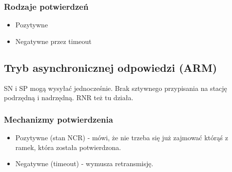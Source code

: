 			\subsubsection{Rodzaje potwierdzeń}
				\begin{itemize}
					\item Pozytywne
					\item Negatywne przez timeout
				\end{itemize}
		\subsection{Tryb asynchronicznej odpowiedzi (ARM)}
			SN i SP mogą wysyłać jednocześnie. Brak sztywnego przypisania na stację podrzędną i nadrzędną. RNR też tu działa.
			\subsubsection{Mechanizmy potwierdzenia}
				\begin{itemize}
					\item Pozytywne (stan NCR) - mówi, że nie trzeba się już zajmować którąś z ramek, która została potwierdzona.
					\item Negatywne (timeout) - wymusza retransmisję.
				\end{itemize}
